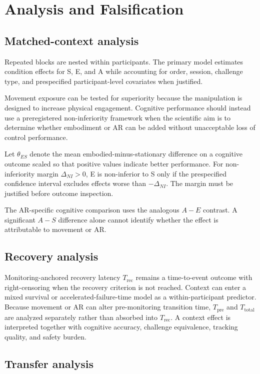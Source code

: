 \section{Analysis and Falsification}

\subsection{Matched-context analysis}

Repeated blocks are nested within participants. The primary model estimates condition effects for S, E, and A while accounting for order, session, challenge type, and prespecified participant-level covariates when justified.

Movement exposure can be tested for superiority because the manipulation is designed to increase physical engagement. Cognitive performance should instead use a preregistered non-inferiority framework when the scientific aim is to determine whether embodiment or AR can be added without unacceptable loss of control performance.

Let \(\theta_{ES}\) denote the mean embodied-minus-stationary difference on a cognitive outcome scaled so that positive values indicate better performance. For non-inferiority margin \(\Delta_{NI}>0\), E is non-inferior to S only if the prespecified confidence interval excludes effects worse than \(-\Delta_{NI}\). The margin must be justified before outcome inspection.

The AR-specific cognitive comparison uses the analogous \(A-E\) contrast. A significant \(A-S\) difference alone cannot identify whether the effect is attributable to movement or AR.

\subsection{Recovery analysis}

Monitoring-anchored recovery latency \(T_{\mathrm{rec}}\) remains a time-to-event outcome with right-censoring when the recovery criterion is not reached. Context can enter a mixed survival or accelerated-failure-time model as a within-participant predictor. Because movement or AR can alter pre-monitoring transition time, \(T_{\mathrm{pre}}\) and \(T_{\mathrm{total}}\) are analyzed separately rather than absorbed into \(T_{\mathrm{rec}}\). A context effect is interpreted together with cognitive accuracy, challenge equivalence, tracking quality, and safety burden.

\subsection{Transfer analysis}


